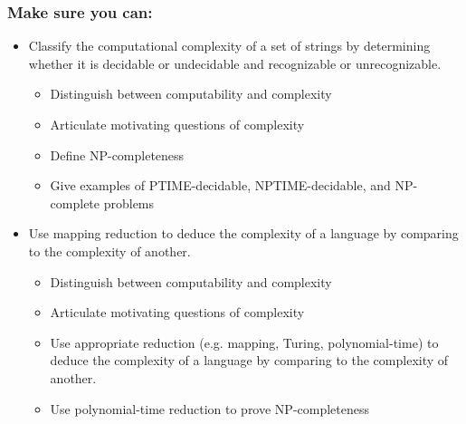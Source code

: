 \subsubsection*{Make sure you can:}
\begin{itemize}
\item Classify the computational complexity of a set of strings by determining whether it is decidable or undecidable and recognizable or unrecognizable.
\begin{itemize}
    \item Distinguish between computability and complexity
    \item Articulate motivating questions of complexity
    \item Define NP-completeness
    \item Give examples of PTIME-decidable, NPTIME-decidable, and NP-complete problems
\end{itemize}
\item Use mapping reduction to deduce the complexity of a language by comparing to the complexity of another.
   \begin{itemize}
      \item Distinguish between computability and complexity
      \item Articulate motivating questions of complexity
      \item Use appropriate reduction (e.g. mapping, Turing, polynomial-time) to deduce the complexity of a language by comparing to the complexity of another.
      \item Use polynomial-time reduction to prove NP-completeness
    \end{itemize}
\end{itemize}

\begin{comment}
\end{comment}

